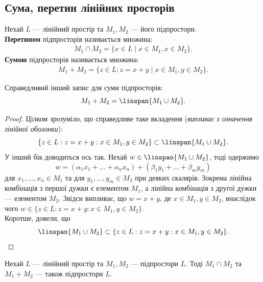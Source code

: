 \documentclass{math_library}
\begin{document}
	\subsection{Сума, перетин лінійних просторів}
	\begin{definition}
	Нехай $L$ --- лінійний простір та $M_1, M_2$ --- його підпростори.\\
	\textbf{Перетином} підпросторів називається множина:
	\begin{align*}
	M_1 \cap M_2 = \{x \in L \mid x \in M_1, x \in M_2 \}.
	\end{align*}
	\textbf{Сумою} підпросторів називається множина:
	\begin{align*}
	M_1 + M_2 = \{z \in L: z = x + y \mid x \in M_1, y \in M_2\}.
	\end{align*}
	\end{definition}
	
	\begin{lemma}
	Справедливий інший запис для суми підпросторів:
	\[
		M_1 + M_2 = \linspan\{M_1 \cup M_2\}.
	\]
	\end{lemma}
	
	\begin{proof}
	Цілком зрозуміло, що справедливе таке вкладення (\textit{випливає з означення лінійної оболонки}):
	\[
	\{z \in L: z = x+y: x \in M_1, y \in M_2\} \subset \linspan\{M_1 \cup M_2\}.
	\]
	У інший бік доводиться ось так. Нехай $w \in \linspan\{M_1 \cup M_2\}$, тоді одержимо
	\[
	w = (\alpha_1 x_1 + \dots + \alpha_n x_n) + (\beta_1 y_1 + \dots + \beta_m y_m)
	\] 
	для $x_1,\dots,x_n \in M_1$ та для $y_1,\dots,y_m \in M_2$ при деяких скалярів. Зокрема лінійна комбінація з першої дужки є елементом $M_1$, а лінійна комбінація з другої дужки --- елементом $M_2$. Звідси випливає, що $w = x+y$, де $x \in M_1, y \in M_2$, внаслідок чого $w \in \{z \in L : z = x+y : x \in M_1, y \in M_2\}$.\\
	Коротше, довели, що
	\[
	\linspan\{M_1 \cup M_2\} \subset \{z \in L: z = x+y: x \in M_1, y \in M_2\}. \qedhere
	\]
	\end{proof}
	
	\begin{theorem}
	Нехай $L$ --- лінійний простір та $M_1,M_2$ --- підпростори $L$. Тоді $M_1 \cap M_2$ та $M_1 + M_2$ --- також підпростори $L$.
	\end{theorem}
	
\end{document}
